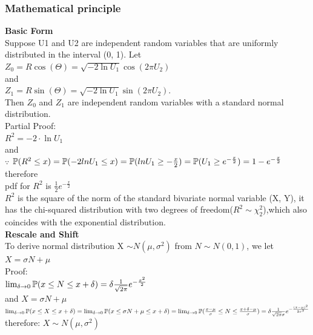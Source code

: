 \documentclass[twoside]{article}
\begin{document}
\begin{multicols*}{2}
\subsubsection{Mathematical principle}
\noindent \textbf {Basic Form}\\
Suppose U1 and U2 are independent random variables that are uniformly distributed in the interval (0, 1). Let\\
${\displaystyle Z_{0}=R\cos(\Theta )={\sqrt {-2\ln U_{1}}}\cos(2\pi U_{2})\,} $\\
and\\
${\displaystyle Z_{1}=R\sin(\Theta )={\sqrt {-2\ln U_{1}}}\sin(2\pi U_{2}).\,}$\\
Then $Z_0$ and $Z_1$ are independent random variables with a standard normal distribution.\\
Partial Proof:\\
${\displaystyle R^{2}=-2\cdot \ln U_{1}\,}$\\
and\\
$\because$
$\mathbb{P}(R^2 \leq x) = \mathbb{P}(-2lnU_1 \leq x)\\ =
\mathbb{P}(lnU_1 \geq -\frac{x}{2})\\
=\mathbb{P}(U_1 \geq e^{-\frac{x}{2}})\\
=1-e^{-\frac{x}{2}}$\\
therefore\\
pdf for $R^2$ is $\frac{1}{2}e^{-\frac{x}{2}}$ \\
$R^2$ is the square of the norm of the standard bivariate normal variable (X, Y), it has the chi-squared distribution with two degrees of freedom($R^2\sim \chi_2^2$),which also coincides with the exponential distribution.\\
\noindent \textbf {Rescale and Shift}\\
 To derive normal distribution X $\sim \displaystyle N(\mu,\sigma^2)$ from $N \sim \displaystyle N(0,1)$, we let $X = \sigma  N + \mu$\\ 
 Proof:\\
$\lim_{\delta \to 0}\mathbb{P}(x \leq N \leq x + \delta ) \\
= \delta \frac{1}{\sqrt{2\pi}}e^{-\frac{x^2}{2}}$\\
and  $X = \sigma  N + \mu$\\ 
$\lim_{\delta \to 0}\mathbb{P}(x \leq X \leq x + \delta )\\
=\lim_{\delta \to 0}\mathbb{P}(x \leq \sigma N + \mu \leq x + \delta )\\
=\lim_{\delta \to 0}\mathbb{P}(\frac{x-\mu}{\sigma} \leq N \leq \frac{x + \delta - \mu}{\sigma} )\\
=\delta \frac{1}{\sqrt{2\pi}\sigma}e^{- \frac{(x-\mu)^2}{2\sigma^2}}$\\
therefore: $X \sim N(\mu,\sigma^2)$\\

\end{multicols*}
\end{document}

